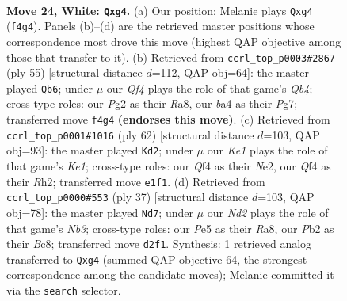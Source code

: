 \documentclass[11pt]{article}
\begin{document}
\begin{figure}[p]
\label{fig:thought-m44}
\end{figure}

\clearpage

\begin{figure}[p]\centering
\begin{subfigure}{0.46\textwidth}\centering
\resizebox{\linewidth}{!}{%
\newchessgame
\chessboard[
  setfen={r3k1nr/b1q5/4p3/pp2P3/b1p2Qpp/P7/RP1NNPP1/2B1K2R w kq - 0 24},
  showmover=false,
  pgfstyle=straightmove, color=movearrow, markmove={f4-g4}
]}
\caption{}
\end{subfigure}\hfill
\begin{subfigure}{0.46\textwidth}\centering
\resizebox{\linewidth}{!}{%
\newchessgame
\chessboard[
  setfen={r3r1k1/5pp1/2nB3p/1q1p3P/bPpP2P1/4PP2/7Q/1BR1R1K1 b - - 4 28},
  showmover=false,
  pgfstyle=straightmove, color=movearrow, markmove={b5-b6}
]}
\caption{}
\end{subfigure}
\\[4pt]
\begin{subfigure}{0.46\textwidth}\centering
\resizebox{\linewidth}{!}{%
\newchessgame
\chessboard[
  setfen={r4r2/1ppq3k/p5b1/3Pp2p/PPP1Ppp1/3Q4/4NN1R/1R2K3 w - - 0 32},
  showmover=false,
  pgfstyle=straightmove, color=movearrow, markmove={e1-d2}
]}
\caption{}
\end{subfigure}\hfill
\begin{subfigure}{0.46\textwidth}\centering
\resizebox{\linewidth}{!}{%
\newchessgame
\chessboard[
  setfen={r1b1k2r/pp3p2/1n1p3p/q2Pp2n/P1p1P2B/2P2P2/2Q1N3/R3KB1R b KQkq - 0 19},
  showmover=false,
  pgfstyle=straightmove, color=movearrow, markmove={b6-d7}
]}
\caption{}
\end{subfigure}
\caption{\textbf{Move 24, White: \texttt{Qxg4}.} (a) Our position; Melanie plays \texttt{Qxg4} (\texttt{f4g4}). Panels (b)--(d) are the retrieved master positions whose correspondence most drove this move (highest QAP objective among those that transfer to it). (b) Retrieved from \texttt{ccrl\_top\_p0003\#2867} (ply 55) [structural distance $d$=112, QAP obj=64]: the master played \texttt{Qb6}; under $\mu$ our \emph{Qf4} plays the role of that game's \emph{Qb4}; cross-type roles: our \emph{P}g2 as their \emph{R}a8, our \emph{b}a4 as their \emph{P}g7; transferred move \texttt{f4g4} \textbf{(endorses this move)}. (c) Retrieved from \texttt{ccrl\_top\_p0001\#1016} (ply 62) [structural distance $d$=103, QAP obj=93]: the master played \texttt{Kd2}; under $\mu$ our \emph{Ke1} plays the role of that game's \emph{Ke1}; cross-type roles: our \emph{Q}f4 as their \emph{N}e2, our \emph{Q}f4 as their \emph{R}h2; transferred move \texttt{e1f1}. (d) Retrieved from \texttt{ccrl\_top\_p0000\#553} (ply 37) [structural distance $d$=103, QAP obj=78]: the master played \texttt{Nd7}; under $\mu$ our \emph{Nd2} plays the role of that game's \emph{Nb3}; cross-type roles: our \emph{P}e5 as their \emph{R}a8, our \emph{P}b2 as their \emph{B}c8; transferred move \texttt{d2f1}. Synthesis: 1 retrieved analog transferred to \texttt{Qxg4} (summed QAP objective 64, the strongest correspondence among the candidate moves); Melanie committed it via the \texttt{search} selector.}
\label{fig:thought-m46}
\end{figure}
\end{document}
